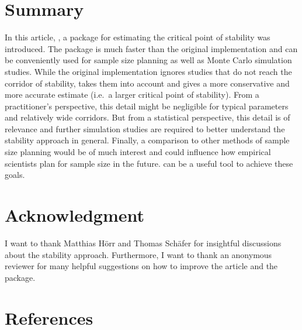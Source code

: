 \hypertarget{summary}{%
\section{Summary}\label{summary}}

In this article, , a package for estimating the critical point of stability was introduced. The package is much faster than the original implementation and can be conveniently used for sample size planning as well as Monte Carlo simulation studies. While the original implementation ignores studies that do not reach the corridor of stability,  takes them into account and gives a more conservative and more accurate estimate (i.e.~a larger critical point of stability). From a practitioner's perspective, this detail might be negligible for typical parameters and relatively wide corridors. But from a statistical perspective, this detail is of relevance and further simulation studies are required to better understand the stability approach in general. Finally, a comparison to other methods of sample size planning would be of much interest and could influence how empirical scientists plan for sample size in the future.  can be a useful tool to achieve these goals.

\hypertarget{acknowledgment}{%
\section{Acknowledgment}\label{acknowledgment}}

I want to thank Matthias Hörr and Thomas Schäfer for insightful discussions about the stability approach. Furthermore, I want to thank an anonymous reviewer for many helpful suggestions on how to improve the article and the package.

\hypertarget{references}{%
\section*{References}\label{references}}

